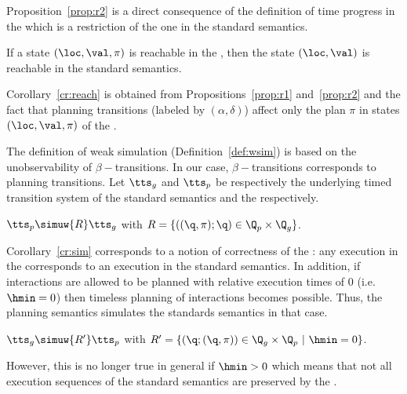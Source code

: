 Proposition~\ref{prop:r2} is a direct consequence of the definition of time progress in 
the \lps which is a restriction of the one in the standard semantics.

\begin{corollary}\label{cr:reach}
If a state $(\loc,\val,\pi)$ is reachable in the \lpsb, then the state $(\loc,\val)$ is 
  reachable in the standard semantics.
\end{corollary}

Corollary~\ref{cr:reach} is obtained from Propositions~\ref{prop:r1} and~\ref{prop:r2} and the 
fact that planning transitions (labeled by $(\alpha,\delta)$) affect only the plan $\pi$ in 
states $(\loc,\val,\pi)$ of the \lpsabr.

The definition of weak simulation (Definition~\ref{def:wsim})
is based on the unobservability of $\beta-$transitions. 
In our case, $\beta-$transitions corresponds to planning transitions.
Let $\tts_g$ and $\tts_p$ be respectively the underlying timed transition system of the standard
semantics and the \lps respectively.
\begin{corollary}\label{cr:sim}
  $\tts_p\simuw{R} \tts_g$ with $R=\{((\q,\pi);\q)\in\Q_p\times\Q_g\}$.
\end{corollary}

Corollary~\ref{cr:sim} corresponds to a notion of correctness of the \lpsb: any execution in 
the \lpsabrb corresponds to an execution in the standard semantics.
In addition, if interactions are allowed to be planned with relative execution times of $0$ 
(i.e. $\hmin = 0$) then timeless planning of interactions becomes possible. Thus, the planning 
semantics simulates the standards semantics in that case.
\begin{corollary}
  $\tts_g\simuw{R'} \tts_p$ with $R'=\{(\q;(\q,\pi))\in\Q_g\times\Q_p\ | \ \hmin=0\}$.
\end{corollary}

However, this is no longer true in general if  $\hmin > 0$ which means that not all execution 
sequences of the standard semantics are preserved by the \lpsb.

